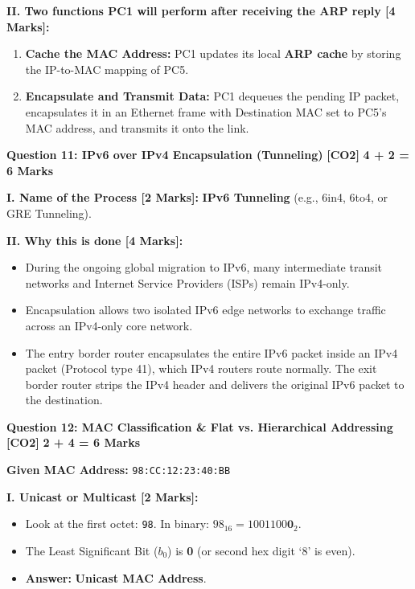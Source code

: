 \documentclass[11pt,a4paper]{article}
\newcommand{\questionheader}[3]{
    \vspace{0.35cm}
    \noindent\colorbox{qboxbg}{
        \parbox{\dimexpr\textwidth-2\fboxsep\relax}{
            \textbf{\textcolor{primary}{\large #1}} \hfill \textbf{\textcolor{accent}{[#2]}} \hfill \textbf{\textcolor{secondary}{#3 Marks}}
        }
    }
    \vspace{0.15cm}
}
\begin{document}
\textbf{II. Two functions PC1 will perform after receiving the ARP reply [4 Marks]:}
\begin{enumerate}
    \item \textbf{Cache the MAC Address:} PC1 updates its local \textbf{ARP cache} by storing the IP-to-MAC mapping of PC5.
    \item \textbf{Encapsulate and Transmit Data:} PC1 dequeues the pending IP packet, encapsulates it in an Ethernet frame with Destination MAC set to PC5's MAC address, and transmits it onto the link.
\end{enumerate}

\questionheader{Question 11: IPv6 over IPv4 Encapsulation (Tunneling)}{CO2}{4 + 2 = 6}

\textbf{I. Name of the Process [2 Marks]:} \textbf{IPv6 Tunneling} (e.g., 6in4, 6to4, or GRE Tunneling).

\textbf{II. Why this is done [4 Marks]:}
\begin{itemize}
    \item During the ongoing global migration to IPv6, many intermediate transit networks and Internet Service Providers (ISPs) remain IPv4-only.
    \item Encapsulation allows two isolated IPv6 edge networks to exchange traffic across an IPv4-only core network.
    \item The entry border router encapsulates the entire IPv6 packet inside an IPv4 packet (Protocol type 41), which IPv4 routers route normally. The exit border router strips the IPv4 header and delivers the original IPv6 packet to the destination.
\end{itemize}

\questionheader{Question 12: MAC Classification \& Flat vs. Hierarchical Addressing}{CO2}{2 + 4 = 6}

\textbf{Given MAC Address:} \texttt{98:CC:12:23:40:BB}

\textbf{I. Unicast or Multicast [2 Marks]:}
\begin{itemize}
    \item Look at the first octet: \texttt{98}. In binary: $98_{16} = 1001100\mathbf{0}_2$.
    \item The Least Significant Bit ($b_0$) is \textbf{0} (or second hex digit `8' is even).
    \item \textbf{Answer:} \textbf{Unicast MAC Address}.
\end{itemize}
\end{document}

